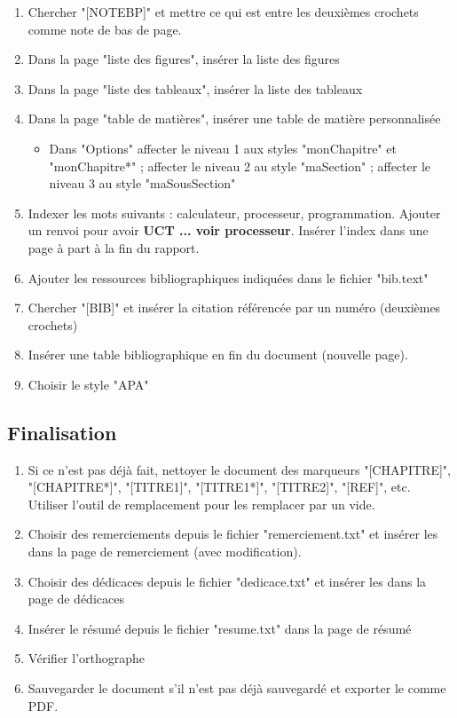 \documentclass[11pt, a4paper]{article}
\begin{document}
\begin{enumerate}
	\item Chercher "[NOTEBP]" et mettre ce qui est entre les deuxièmes crochets comme note de bas de page. 
	\item Dans la page "liste des figures", insérer la liste des figures
	\item Dans la page "liste des tableaux", insérer la liste des tableaux
	\item Dans la page "table de matières", insérer une table de matière personnalisée
	\begin{itemize}
		\item Dans "Options" affecter le niveau 1 aux styles "monChapitre" et "monChapitre*" ; affecter le niveau 2 au style "maSection" ; affecter le niveau 3 au style "maSousSection"
	\end{itemize}
	\item Indexer les mots suivants : calculateur, processeur, programmation. Ajouter un renvoi pour avoir \textbf{UCT ... voir processeur}. Insérer l'index dans une page à part à la fin du rapport. 
	\item Ajouter les ressources bibliographiques indiquées dans le fichier "bib.text"
	\item Chercher "[BIB]" et insérer la citation référencée par un numéro (deuxièmes crochets)
	\item Insérer une table bibliographique en fin du document (nouvelle page). 
	\item Choisir le style "APA" 
\end{enumerate}

\subsection*{Finalisation}

\begin{enumerate}
	\item Si ce n'est pas déjà fait, nettoyer le document des marqueurs "[CHAPITRE]", "[CHAPITRE*]", "[TITRE1]", "[TITRE1*]", "[TITRE2]", "[REF]", etc. Utiliser l'outil de remplacement pour les remplacer par un vide. 
	\item Choisir des remerciements depuis le fichier "remerciement.txt" et insérer les dans la page de remerciement (avec modification). 
	\item Choisir des dédicaces depuis le fichier "dedicace.txt" et insérer les dans la page de dédicaces
	\item Insérer le résumé depuis le fichier "resume.txt" dans la page de résumé 
	\item Vérifier l'orthographe
	\item Sauvegarder le document s'il n'est pas déjà sauvegardé et exporter le comme PDF.
\end{enumerate}
\end{document}
